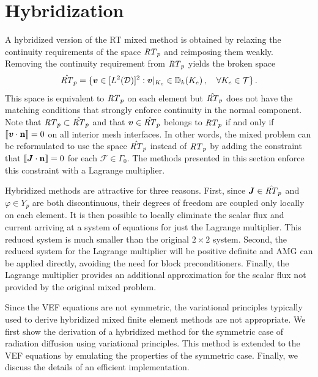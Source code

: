 \documentclass[../doc.tex]{subfiles}
\begin{document}
\section{Hybridization} \label{rtvef_sec:hyb}
A hybridized version of the RT mixed method is obtained by relaxing the continuity requirements of the space $\mathit{RT}_p$ and reimposing them weakly. Removing the continuity requirement from $\mathit{RT}_p$ yields the broken space 
	\begin{equation}
		\hat{\mathit{RT}}_p = \{ \boldsymbol{v} \in [L^2(\mathcal{D})]^2 : \boldsymbol{v}|_{K_e} \in \mathbb{D}_k(K_e) \,, \quad \forall K_e \in \mathcal{T} \} \,. 
	\end{equation}
This space is equivalent to $\mathit{RT}_p$ on each element but $\hat{\mathit{RT}}_p$ does not have the matching conditions that strongly enforce continuity in the normal component. Note that $\mathit{RT}_p \subset \hat{\mathit{RT}}_p$ and that $\boldsymbol{v} \in \hat{\mathit{RT}}_p$ belongs to $\mathit{RT}_p$ if and only if $\left\llbracket\boldsymbol{v}\cdot\boldsymbol{\mathrm{n}} \right\rrbracket = 0$ on all interior mesh interfaces. In other words, the mixed problem can be reformulated to use the space $\hat{\mathit{RT}}_p$ instead of $\mathit{RT}_p$ by adding the constraint that $\left\llbracket\boldsymbol{J}\cdot\boldsymbol{\mathrm{n}} \right\rrbracket = 0$ for each $\mathcal{F} \in \Gamma_0$. The methods presented in this section enforce this constraint with a Lagrange multiplier. 

Hybridized methods are attractive for three reasons. First, since $\boldsymbol{J}\in\hat{\mathit{RT}}_p$ and $\varphi \in Y_p$ are both discontinuous, their degrees of freedom are coupled only locally on each element. It is then possible to locally eliminate the scalar flux and current arriving at a system of equations for just the Lagrange multiplier. This reduced system is much smaller than the original $2\times 2$ system. Second, the reduced system for the Lagrange multiplier will be positive definite and AMG can be applied directly, avoiding the need for block preconditioners. Finally, the Lagrange multiplier provides an additional approximation for the scalar flux not provided by the original mixed problem. 

Since the VEF equations are not symmetric, the variational principles typically used to derive hybridized mixed finite element methods are not appropriate. We first show the derivation of a hybridized method for the symmetric case of radiation diffusion using variational principles. This method is extended to the VEF equations by emulating the properties of the symmetric case. Finally, we discuss the details of an efficient implementation. 
\end{document}
